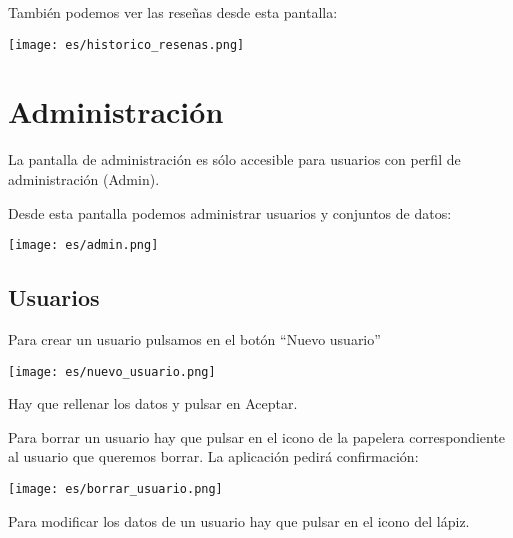 \documentclass{ol-softwaremanual}
\begin{document}
También podemos ver las reseñas desde esta pantalla:

\vspace{20pt}
\centerline{\texttt{[image: es/historico\_resenas.png]}}
\vspace{20pt}

\newpage

\section{Administración}
La pantalla de administración es sólo accesible para usuarios con perfil de administración (Admin).

Desde esta pantalla podemos administrar usuarios y conjuntos de datos:
\vspace{20pt}
\centerline{\texttt{[image: es/admin.png]}}
\vspace{20pt}

\subsection{Usuarios}

Para crear un usuario pulsamos en el botón ``Nuevo usuario''

\vspace{20pt}
\centerline{\texttt{[image: es/nuevo\_usuario.png]}}
\vspace{20pt}

Hay que rellenar los datos y pulsar en Aceptar.

Para borrar un usuario hay que pulsar en el icono de la papelera correspondiente al usuario que queremos borrar.
La aplicación pedirá confirmación:

\vspace{20pt}
\centerline{\texttt{[image: es/borrar\_usuario.png]}}
\vspace{20pt}

Para modificar los datos de un usuario hay que pulsar en el icono del lápiz.
\end{document}
